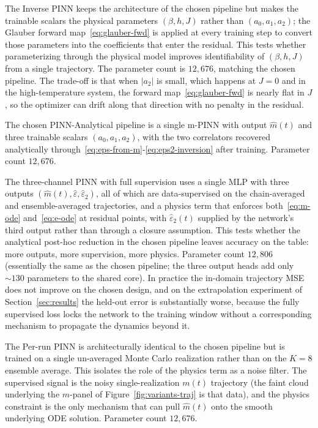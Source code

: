 \documentclass[conference]{IEEEtran}
\newcommand{\mhat}{\hat m(t)}
\newcommand{\eps}{\varepsilon}
\newcommand{\epstwo}{\varepsilon_2}
\begin{document}
The Inverse PINN keeps the architecture of the chosen pipeline but
makes the trainable scalars the physical parameters $(\beta, h, J)$
rather than $(a_0, a_1, a_2)$; the Glauber forward
map~\eqref{eq:glauber-fwd} is applied at every training step to
convert those parameters into the coefficients that enter the
residual. This tests whether parameterizing through the physical
model improves identifiability of $(\beta, h, J)$ from a single
trajectory. The parameter count is $12{,}676$, matching the chosen
pipeline. The trade-off is that when $|a_2|$ is small, which happens
at $J = 0$ and in the high-temperature system, the forward
map~\eqref{eq:glauber-fwd} is nearly flat in $J$, so the optimizer
can drift along that direction with no penalty in the residual.

The chosen PINN-Analytical pipeline is a single m-PINN with output
$\mhat$ and three trainable scalars $(a_0, a_1, a_2)$, with the
two correlators recovered analytically
through~\eqref{eq:eps-from-m}-\eqref{eq:eps2-inversion} after
training. Parameter count $12{,}676$.

The three-channel PINN with full supervision uses a single MLP with
three outputs $(\mhat, \hat\eps, \hat\epstwo)$, all of which are
data-supervised on the chain-averaged and ensemble-averaged trajectories,
and a physics term that enforces both~\eqref{eq:m-ode}
and~\eqref{eq:e-ode} at residual points, with $\hat\epstwo(t)$
supplied by the network's third output rather than through a closure
assumption. This tests whether the analytical post-hoc reduction in the
chosen pipeline leaves accuracy on the table: more outputs, more
supervision, more physics. Parameter count $12{,}806$ (essentially
the same as the chosen pipeline; the three output heads add only
$\sim\!130$ parameters to the shared core). In practice the
in-domain trajectory MSE does not improve on the chosen design, and
on the extrapolation experiment of Section~\ref{sec:results} the
held-out error is substantially worse, because the fully supervised
loss locks the network to the training window without a
corresponding mechanism to propagate the dynamics beyond it.

The Per-run PINN is architecturally identical to the chosen pipeline
but is trained on a single un-averaged Monte Carlo realization
rather than on the $K = 8$ ensemble average. This isolates the role
of the physics term as a noise filter. The supervised signal is the
noisy single-realization $m(t)$ trajectory (the faint cloud
underlying the $m$-panel of Figure~\ref{fig:variants-traj} is that
data), and the physics constraint is the only mechanism that can
pull $\mhat$ onto the smooth underlying ODE solution. Parameter
count $12{,}676$.
\end{document}
